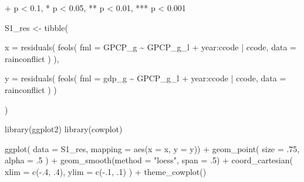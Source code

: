 \documentclass[
  a4paper,
  DIV=11,
  oneside]{scrreprt}
\newenvironment{Shaded}{\begin{snugshade}}{\end{snugshade}}
\newcommand{\AttributeTok}[1]{\textcolor[rgb]{0.40,0.45,0.13}{#1}}
\newcommand{\DecValTok}[1]{\textcolor[rgb]{0.68,0.00,0.00}{#1}}
\newcommand{\FunctionTok}[1]{\textcolor[rgb]{0.28,0.35,0.67}{#1}}
\newcommand{\NormalTok}[1]{\textcolor[rgb]{0.00,0.23,0.31}{#1}}
\newcommand{\OtherTok}[1]{\textcolor[rgb]{0.00,0.23,0.31}{#1}}
\newcommand{\SpecialCharTok}[1]{\textcolor[rgb]{0.37,0.37,0.37}{#1}}
\newcommand{\StringTok}[1]{\textcolor[rgb]{0.13,0.47,0.30}{#1}}
\begin{document}
\begin{minipage}{\linewidth}
+ p < 0.1, * p < 0.05, ** p < 0.01, *** p < 0.001\\
\end{minipage}

\begin{Shaded}
\begin{Highlighting}[]
\NormalTok{S1\_res }\OtherTok{\textless{}{-}} \FunctionTok{tibble}\NormalTok{(}

  \AttributeTok{x =} \FunctionTok{residuals}\NormalTok{(}
    \FunctionTok{feols}\NormalTok{(}
      \AttributeTok{fml =}\NormalTok{ GPCP\_g }\SpecialCharTok{\textasciitilde{}}\NormalTok{ GPCP\_g\_l}
      \SpecialCharTok{+}\NormalTok{ year}\SpecialCharTok{:}\NormalTok{ccode}
      \SpecialCharTok{|}\NormalTok{ ccode,}
      \AttributeTok{data =}\NormalTok{ rainconflict}
\NormalTok{    )}
\NormalTok{  ),}
  
  \AttributeTok{y =} \FunctionTok{residuals}\NormalTok{(}
    \FunctionTok{feols}\NormalTok{(}
      \AttributeTok{fml =}\NormalTok{ gdp\_g }\SpecialCharTok{\textasciitilde{}}\NormalTok{ GPCP\_g\_l}
      \SpecialCharTok{+}\NormalTok{ year}\SpecialCharTok{:}\NormalTok{ccode}
      \SpecialCharTok{|}\NormalTok{ ccode,}
      \AttributeTok{data =}\NormalTok{ rainconflict}
\NormalTok{    )}
\NormalTok{  )}
  
\NormalTok{)}
\end{Highlighting}
\end{Shaded}

\begin{Shaded}
\begin{Highlighting}[]
\FunctionTok{library}\NormalTok{(ggplot2)}
\FunctionTok{library}\NormalTok{(cowplot)}

\FunctionTok{ggplot}\NormalTok{(}
  \AttributeTok{data =}\NormalTok{ S1\_res,}
  \AttributeTok{mapping =} \FunctionTok{aes}\NormalTok{(}\AttributeTok{x =}\NormalTok{ x, }\AttributeTok{y =}\NormalTok{ y)) }\SpecialCharTok{+}
  \FunctionTok{geom\_point}\NormalTok{(}
    \AttributeTok{size =}\NormalTok{ .}\DecValTok{75}\NormalTok{, }
    \AttributeTok{alpha =}\NormalTok{ .}\DecValTok{5}
\NormalTok{  ) }\SpecialCharTok{+}
  \FunctionTok{geom\_smooth}\NormalTok{(}\AttributeTok{method =} \StringTok{"loess"}\NormalTok{, }\AttributeTok{span =}\NormalTok{ .}\DecValTok{5}\NormalTok{) }\SpecialCharTok{+}
  \FunctionTok{coord\_cartesian}\NormalTok{(}
    \AttributeTok{xlim =} \FunctionTok{c}\NormalTok{(}\SpecialCharTok{{-}}\NormalTok{.}\DecValTok{4}\NormalTok{, .}\DecValTok{4}\NormalTok{), }
    \AttributeTok{ylim =} \FunctionTok{c}\NormalTok{(}\SpecialCharTok{{-}}\NormalTok{.}\DecValTok{1}\NormalTok{, .}\DecValTok{1}\NormalTok{)}
\NormalTok{  ) }\SpecialCharTok{+}
  \FunctionTok{theme\_cowplot}\NormalTok{()}
\end{Highlighting}
\end{Shaded}
\end{document}
